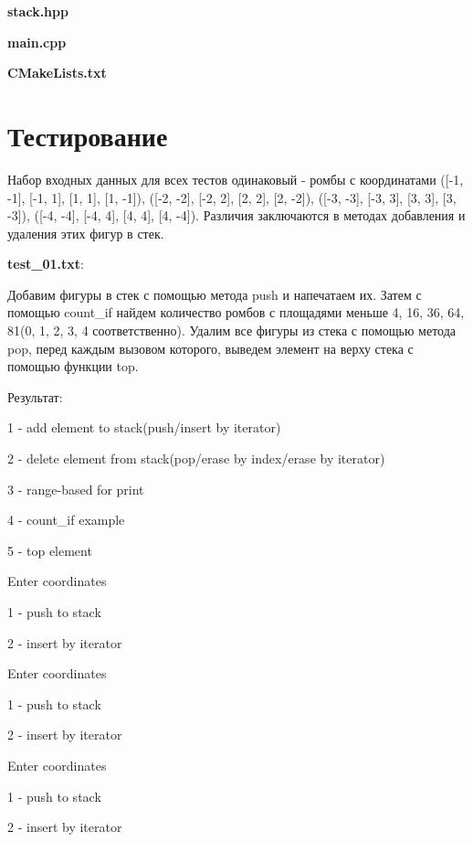 \documentclass[a4paper, 12pt]{article}
\begin{document}
\vspace{3ex}
\textbf{\large{stack.hpp}}



\vspace{3ex}
\textbf{\large{main.cpp}}


\vspace{3ex}
\textbf{\large{CMakeLists.txt}}


%
\newpage
\section{Тестирование}
\vspace{3ex}

Набор входных данных для всех тестов одинаковый - ромбы с координатами ([-1, -1], [-1, 1], [1, 1],
[1, -1]), ([-2, -2], [-2, 2], [2, 2], [2, -2]), ([-3, -3], [-3, 3], [3, 3], [3, -3]),
([-4, -4], [-4, 4], [4, 4], [4, -4]). Различия заключаются в методах добавления и удаления этих фигур в стек.

\textbf{test\_01.txt}:

Добавим фигуры в стек с помощью метода push и напечатаем их. Затем с помощью count\_if найдем количество ромбов с площадями меньше 4, 16, 36, 64, 81(0, 1, 2, 3, 4 соответственно). Удалим все фигуры из стека с помощью метода pop, перед каждым вызовом которого, выведем элемент на верху стека с помощью функции top. 

Результат:

1 - add element to stack(push/insert by iterator)

2 - delete element from stack(pop/erase by index/erase by iterator)

3 - range-based for print

4 - count\_if example

5 - top element

Enter coordinates

1 - push to stack

2 - insert by iterator

Enter coordinates

1 - push to stack

2 - insert by iterator

Enter coordinates

1 - push to stack

2 - insert by iterator
\end{document}
